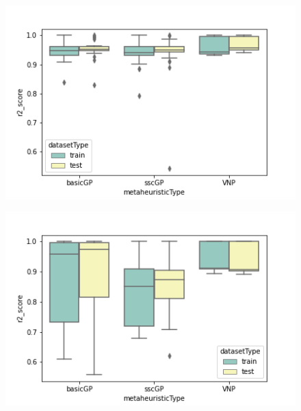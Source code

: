 \documentclass[main.tex]{subfiles}
\begin{document}
\begin{figure}
\centering
\begin{minipage}{.5\textwidth}
  \centering
  \includegraphics[width=1.1\linewidth]{../images/f9.png}
  \label{fig:f9}
\end{minipage}%
\begin{minipage}{.5\textwidth}
  \centering
  \includegraphics[width=1.1\linewidth]{../images/f01.png}
  \label{fig:f01}
\end{minipage}
\end{figure}
\end{document}
